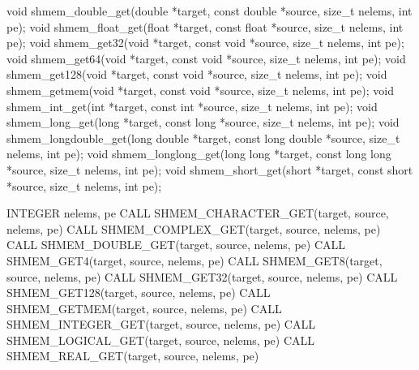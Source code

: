 \synC   %

void shmem_double_get(double *target, const double  *source, size_t nelems, int pe);
void shmem_float_get(float *target, const float *source, size_t nelems, int pe);
void shmem_get32(void *target, const void *source, size_t  nelems,  int pe);
void shmem_get64(void  *target, const void *source, size_t nelems, int pe);
void shmem_get128(void *target, const void *source, size_t nelems,  int pe);
void shmem_getmem(void *target, const void *source, size_t nelems, int pe);
void shmem_int_get(int *target, const int *source, size_t  nelems,  int pe);
void shmem_long_get(long *target, const long *source, size_t nelems, int pe);
void shmem_longdouble_get(long double *target, const long double *source, size_t nelems, int pe);
void shmem_longlong_get(long long *target, const long long *source, size_t nelems, int pe);
void shmem_short_get(short *target, const short *source, size_t nelems, int pe); %
\synF   %

INTEGER nelems, pe
CALL SHMEM_CHARACTER_GET(target, source, nelems, pe)
CALL SHMEM_COMPLEX_GET(target, source, nelems, pe)
CALL SHMEM_DOUBLE_GET(target, source, nelems, pe)
CALL SHMEM_GET4(target, source, nelems, pe)
CALL SHMEM_GET8(target, source, nelems, pe)
CALL SHMEM_GET32(target, source, nelems, pe)
CALL SHMEM_GET128(target, source, nelems, pe)
CALL SHMEM_GETMEM(target, source, nelems, pe)
CALL SHMEM_INTEGER_GET(target, source, nelems, pe)
CALL SHMEM_LOGICAL_GET(target, source, nelems, pe)
CALL SHMEM_REAL_GET(target, source, nelems, pe) %

